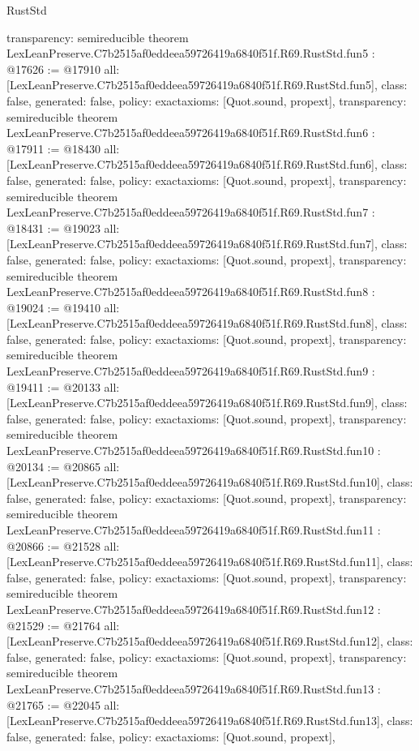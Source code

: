 \begin{lexlean}{RustStd}
\begin{coremodule}
{  transparency: semireducible
}
theorem LexLeanPreserve.C7b2515af0eddeea59726419a6840f51f.R69.RustStd.fun5 : @17626 := @17910 {
  all: [LexLeanPreserve.C7b2515af0eddeea59726419a6840f51f.R69.RustStd.fun5],
  class: false,
  generated: false,
  policy: exact{axioms: [Quot.sound, propext]},
  transparency: semireducible
}
theorem LexLeanPreserve.C7b2515af0eddeea59726419a6840f51f.R69.RustStd.fun6 : @17911 := @18430 {
  all: [LexLeanPreserve.C7b2515af0eddeea59726419a6840f51f.R69.RustStd.fun6],
  class: false,
  generated: false,
  policy: exact{axioms: [Quot.sound, propext]},
  transparency: semireducible
}
theorem LexLeanPreserve.C7b2515af0eddeea59726419a6840f51f.R69.RustStd.fun7 : @18431 := @19023 {
  all: [LexLeanPreserve.C7b2515af0eddeea59726419a6840f51f.R69.RustStd.fun7],
  class: false,
  generated: false,
  policy: exact{axioms: [Quot.sound, propext]},
  transparency: semireducible
}
theorem LexLeanPreserve.C7b2515af0eddeea59726419a6840f51f.R69.RustStd.fun8 : @19024 := @19410 {
  all: [LexLeanPreserve.C7b2515af0eddeea59726419a6840f51f.R69.RustStd.fun8],
  class: false,
  generated: false,
  policy: exact{axioms: [Quot.sound, propext]},
  transparency: semireducible
}
theorem LexLeanPreserve.C7b2515af0eddeea59726419a6840f51f.R69.RustStd.fun9 : @19411 := @20133 {
  all: [LexLeanPreserve.C7b2515af0eddeea59726419a6840f51f.R69.RustStd.fun9],
  class: false,
  generated: false,
  policy: exact{axioms: [Quot.sound, propext]},
  transparency: semireducible
}
theorem LexLeanPreserve.C7b2515af0eddeea59726419a6840f51f.R69.RustStd.fun10 : @20134 := @20865 {
  all: [LexLeanPreserve.C7b2515af0eddeea59726419a6840f51f.R69.RustStd.fun10],
  class: false,
  generated: false,
  policy: exact{axioms: [Quot.sound, propext]},
  transparency: semireducible
}
theorem LexLeanPreserve.C7b2515af0eddeea59726419a6840f51f.R69.RustStd.fun11 : @20866 := @21528 {
  all: [LexLeanPreserve.C7b2515af0eddeea59726419a6840f51f.R69.RustStd.fun11],
  class: false,
  generated: false,
  policy: exact{axioms: [Quot.sound, propext]},
  transparency: semireducible
}
theorem LexLeanPreserve.C7b2515af0eddeea59726419a6840f51f.R69.RustStd.fun12 : @21529 := @21764 {
  all: [LexLeanPreserve.C7b2515af0eddeea59726419a6840f51f.R69.RustStd.fun12],
  class: false,
  generated: false,
  policy: exact{axioms: [Quot.sound, propext]},
  transparency: semireducible
}
theorem LexLeanPreserve.C7b2515af0eddeea59726419a6840f51f.R69.RustStd.fun13 : @21765 := @22045 {
  all: [LexLeanPreserve.C7b2515af0eddeea59726419a6840f51f.R69.RustStd.fun13],
  class: false,
  generated: false,
  policy: exact{axioms: [Quot.sound, propext]},
}
\end{coremodule}
\end{lexlean}
